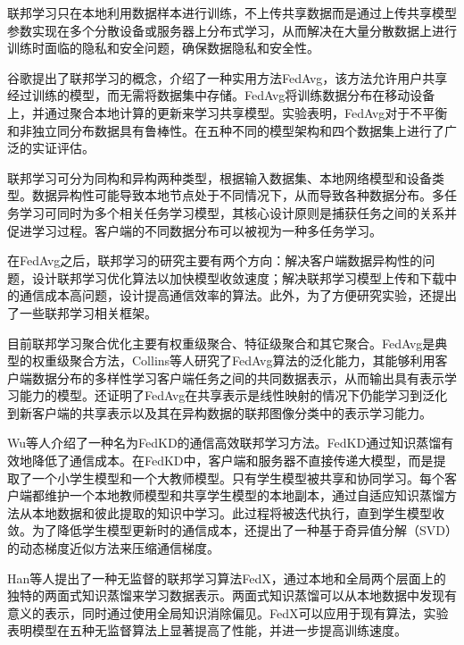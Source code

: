 联邦学习只在本地利用数据样本进行训练，不上传共享数据而是通过上传共享模型参数实现在多个分散设备或服务器上分布式学习，从而解决在大量分散数据上进行训练时面临的隐私和安全问题，确保数据隐私和安全性。

谷歌提出了联邦学习的概念，介绍了一种实用方法FedAvg\cite{mcmahanCommunicationEfficientLearningDeep2023}，该方法允许用户共享经过训练的模型，而无需将数据集中存储。FedAvg将训练数据分布在移动设备上，并通过聚合本地计算的更新来学习共享模型。实验表明，FedAvg对于不平衡和非独立同分布数据具有鲁棒性。在五种不同的模型架构和四个数据集上进行了广泛的实证评估。

联邦学习可分为同构和异构两种类型，根据输入数据集、本地网络模型和设备类型。数据异构性可能导致本地节点处于不同情况下，从而导致各种数据分布。多任务学习可同时为多个相关任务学习模型，其核心设计原则是捕获任务之间的关系并促进学习过程。客户端的不同数据分布可以被视为一种多任务学习。

在FedAvg之后，联邦学习的研究主要有两个方向：解决客户端数据异构性的问题，设计联邦学习优化算法以加快模型收敛速度；解决联邦学习模型上传和下载中的通信成本高问题，设计提高通信效率的算法。此外，为了方便研究实验，还提出了一些联邦学习相关框架。\cite{zengFedLabFlexibleFederated2022}

目前联邦学习聚合优化主要有权重级聚合、特征级聚合和其它聚合\cite{sattlerRobustCommunicationEfficientFederated2019,wangFederatedLearningMatched2020,zhaoFederatedLearningNonIID2022}。FedAvg是典型的权重级聚合方法，Collins等人\cite{collinsFedAvgFineTuning2022}研究了FedAvg算法的泛化能力，其能够利用客户端数据分布的多样性学习客户端任务之间的共同数据表示，从而输出具有表示学习能力的模型。还证明了FedAvg在共享表示是线性映射的情况下仍能学习到泛化到新客户端的共享表示以及其在异构数据的联邦图像分类中的表示学习能力。

Wu等人\cite{banabilahFederatedLearningReview2022}介绍了一种名为FedKD的通信高效联邦学习方法。FedKD通过知识蒸馏有效地降低了通信成本。在FedKD中，客户端和服务器不直接传递大模型，而是提取了一个小学生模型和一个大教师模型。只有学生模型被共享和协同学习。每个客户端都维护一个本地教师模型和共享学生模型的本地副本，通过自适应知识蒸馏方法从本地数据和彼此提取的知识中学习。此过程将被迭代执行，直到学生模型收敛。为了降低学生模型更新时的通信成本，还提出了一种基于奇异值分解（SVD）的动态梯度近似方法来压缩通信梯度。

Han等人\cite{hanFedXUnsupervisedFederated2022}提出了一种无监督的联邦学习算法FedX，通过本地和全局两个层面上的独特的两面式知识蒸馏来学习数据表示。两面式知识蒸馏可以从本地数据中发现有意义的表示，同时通过使用全局知识消除偏见。FedX可以应用于现有算法，实验表明模型在五种无监督算法上显著提高了性能，并进一步提高训练速度。

